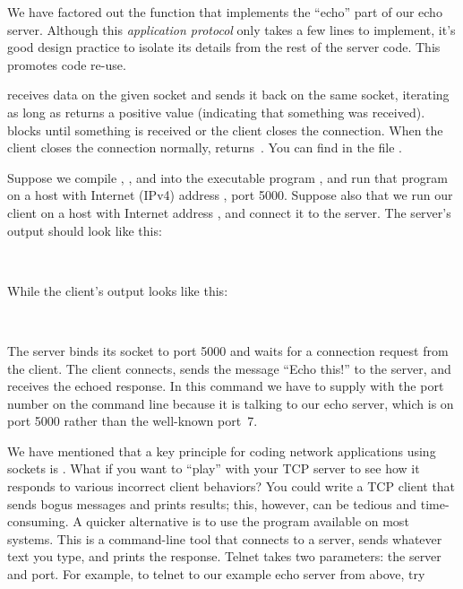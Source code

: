 We have factored out the function that implements the ``echo'' part of
our echo server.
% 
Although this \emph{application protocol\/}
only takes a few lines to implement, it's good design
practice to isolate its details from the rest of the server code.
This promotes code re-use.

 receives data on the
given socket and sends 
it back on the same socket, iterating as long as 
returns a positive value (indicating that something was received).
 blocks until something is
received or the client closes the connection.  When the client closes
the connection normally,  returns~.  You can
find  in the file .


Suppose we compile , , and
 into the executable program 
, and run that program on a host with Internet
(IPv4) address \serverIPiv, port 5000.  Suppose also that we
run our client on a host with Internet address \clientIPiv, and
connect it to the server.  The server's output should look 
like this:

\begin{shell}
\prompt {} \\
\end{shell}

While the client's output looks like this:

\begin{shell}
\prompt {} \\
\end{shell}

The server binds its socket to port 5000 and waits for a connection
request from the client.  The client connects, sends the message
``Echo this!'' to the server, and receives the echoed response.  In
this command we have to supply
 with the port number on the command line
because it is talking to our echo server, which is on port
5000 rather than the well-known port~7.

We have mentioned that a key principle for coding network applications
using sockets is .
%
What if you want to ``play'' with your TCP server to see how it responds to
various incorrect client behaviors?
You could write a TCP client that sends bogus messages and
prints results; this, however, can be tedious and time-consuming.  A quicker
alternative is to use the  program available on most systems. 
This is a command-line tool that connects to a server, sends whatever text you
type, and prints the response.  Telnet takes two parameters:  the server and
port.  For example, to telnet to our example echo server from above, try

